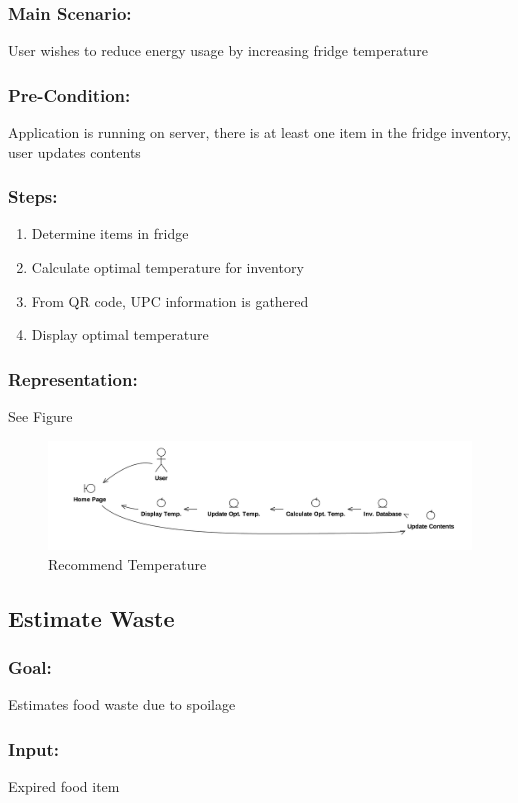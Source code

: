 		\subsubsection{Main Scenario:} User wishes to reduce energy usage by increasing fridge temperature 
		\subsubsection{Pre-Condition:} Application is running on server, there is at least one item in the fridge inventory, user updates contents
		\subsubsection{Steps:} 
		\begin{enumerate}
			\item Determine items in fridge
			\item Calculate optimal temperature for inventory
			\item From QR code, UPC information is gathered
			\item Display optimal temperature
		\end{enumerate}
		\subsubsection{Representation:} See Figure~\thesubsection
		\begin{figure}[p]
			\centering
			\includegraphics[width=\textwidth]{temp.png}
			\caption{Recommend Temperature}
		\end{figure}
	\subsection{Estimate Waste}
		\subsubsection{Goal:} Estimates food waste due to spoilage
		\subsubsection{Input:} Expired food item 
